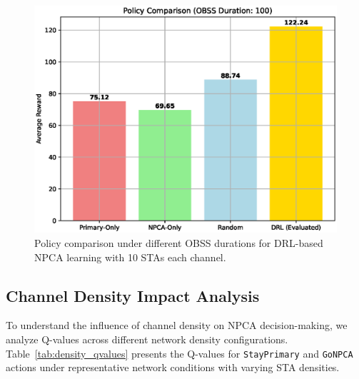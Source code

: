 \documentclass[conference]{IEEEtran}
\begin{document}
\begin{figure}
\centerline{\includegraphics[width=\columnwidth]{figure/policy_comparison_obss_100.eps}}
\caption{Policy comparison under different OBSS durations for DRL-based NPCA learning with 10 STAs each channel.}
\label{fig:policy_comparison}
\end{figure}

\subsection{Channel Density Impact Analysis}

To understand the influence of channel density on NPCA decision-making, we analyze Q-values across different network density configurations. Table~\ref{tab:density_qvalues} presents the Q-values for \texttt{StayPrimary} and \texttt{GoNPCA} actions under representative network conditions with varying STA densities.
\end{document}
